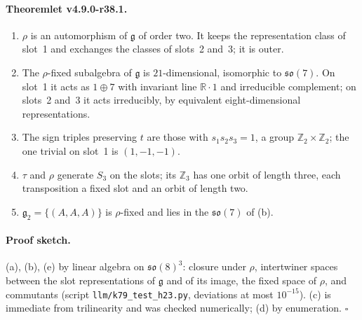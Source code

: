 \paragraph{Theoremlet v4.9.0-r38.1.}
\begin{enumerate}[leftmargin=2em]
\item[(a)] \(\rho\) is an automorphism of \(\mathfrak g\) of order two.  It keeps the representation class of slot~1 and exchanges the
classes of slots~2 and~3; it is outer.
\item[(b)] The \(\rho\)-fixed subalgebra of \(\mathfrak g\) is \(21\)-dimensional, isomorphic to \(\mathfrak{so}(7)\).  On slot~1 it acts as
\(1\oplus7\) with invariant line \(\mathbb R\cdot1\) and irreducible complement; on slots~2 and~3 it acts irreducibly, by equivalent
eight-dimensional representations.
\item[(c)] The sign triples preserving \(t\) are those with \(s_1s_2s_3=1\), a group \(\mathbb Z_2\times\mathbb Z_2\); the one trivial on
slot~1 is \((1,-1,-1)\).
\item[(d)] \(\tau\) and \(\rho\) generate \(S_3\) on the slots; its \(\mathbb Z_3\) has one orbit of length three, each transposition a
fixed slot and an orbit of length two.
\item[(e)] \(\mathfrak g_2=\{(A,A,A)\}\) is \(\rho\)-fixed and lies in the \(\mathfrak{so}(7)\) of (b).
\end{enumerate}

\paragraph{Proof sketch.}
(a), (b), (e) by linear algebra on \(\mathfrak{so}(8)^3\): closure under \(\rho\), intertwiner spaces between the slot representations
of \(\mathfrak g\) and of its image, the fixed space of \(\rho\), and commutants (script \texttt{llm/k79\_test\_h23.py}, deviations at most
\(10^{-15}\)).  (c) is immediate from trilinearity and was checked numerically; (d) by enumeration.  \(\square\)

